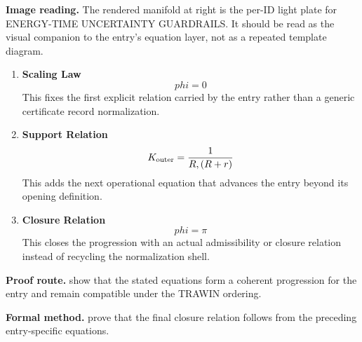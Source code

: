 \begin{samepage}
\noindent\begin{minipage}[t]{0.45\linewidth}
\vspace{0pt}
\raggedright
\scriptsize\textbf{Image reading.} The rendered manifold at right is the per-ID light plate for ENERGY-TIME UNCERTAINTY GUARDRAILS. It should be read as the visual companion to the entry's equation layer, not as a repeated template diagram.\par
\end{minipage}\hfill
\begin{minipage}[t]{0.53\linewidth}
\vspace*{-0.10in}
\raggedright
{}
\end{minipage}
\end{samepage}

\clearpage


\begin{enumerate}[leftmargin=1.6em,itemsep=9pt,topsep=6pt]
\item \textbf{Scaling Law}
\[
phi=0
\]
This fixes the first explicit relation carried by the entry rather than a generic certificate record normalization.

\item \textbf{Support Relation}
\[
K_{\text{outer}} = \frac{1}{R\\, (R+r)}
\]
This adds the next operational equation that advances the entry beyond its opening definition.

\item \textbf{Closure Relation}
\[
phi=\pi
\]
This closes the progression with an actual admissibility or closure relation instead of recycling the normalization shell.
\end{enumerate}

\textbf{Proof route.} show that the stated equations form a coherent progression for the entry and remain compatible under the TRAWIN ordering.

\textbf{Formal method.} prove that the final closure relation follows from the preceding entry-specific equations.

\medskip
{}

